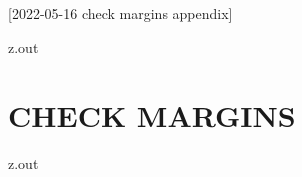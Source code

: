 [2022-05-16 check margins appendix]

\begin{VerbatimOut}{z.out}
\chapter{CHECK MARGINS}
\end{VerbatimOut}

\MyIO


\begin{VerbatimOut}{z.out}
\end{VerbatimOut}

\MyIO
